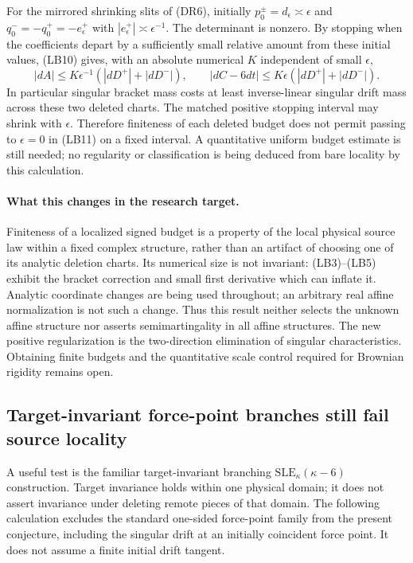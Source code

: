 \documentclass[11pt]{article}
\theoremstyle{definition}\newtheorem{definition}[theorem]{Definition}
\theoremstyle{remark}\newtheorem{remark}[theorem]{Remark}
\begin{document}
For the mirrored shrinking slits of (DR6), initially
$p_0^\pm=d_\epsilon\asymp\epsilon$ and
$q_0^-=-q_0^+=-e_\epsilon^+$ with
$|e_\epsilon^+|\asymp\epsilon^{-1}$. The determinant is nonzero.
By stopping when the coefficients depart by a sufficiently small
relative amount from these initial values, (LB10) gives, with an
absolute numerical $K$ independent of small $\epsilon$,
\[
 |dA|\le K\epsilon^{-1}(|dD^+|+|dD^-|),\qquad
 |dC-6dt|\le K\epsilon(|dD^+|+|dD^-|).
 \tag{LB11}
\]
In particular singular bracket mass costs at least inverse-linear
singular drift mass across these two deleted charts. The matched
positive stopping interval may shrink with $\epsilon$. Therefore
finiteness of each deleted budget does not permit passing to
$\epsilon=0$ in (LB11) on a fixed interval. A quantitative uniform
budget estimate is still needed; no regularity or classification is
being deduced from bare locality by this calculation.

\paragraph{What this changes in the research target.}
Finiteness of a localized signed budget is a property of the local
physical source law within a fixed complex structure, rather than an
artifact of choosing one of its analytic deletion charts. Its numerical
size is not invariant: (LB3)--(LB5) exhibit the bracket correction and
small first derivative which can inflate it. Analytic coordinate changes
are being used throughout; an arbitrary real affine normalization is
not such a change. Thus this result neither selects the unknown affine
structure nor asserts semimartingality in all affine structures. The new
positive regularization is the two-direction elimination of singular
characteristics. Obtaining finite budgets and the quantitative scale
control required for Brownian rigidity remains open.

\subsection{Target-invariant force-point branches still fail source locality}
\label{sec:forcepoint-locality-audit}

A useful test is the familiar target-invariant branching
$\mathrm{SLE}_\kappa(\kappa-6)$ construction. Target invariance holds
within one physical domain; it does not assert invariance under deleting
remote pieces of that domain. The following calculation excludes the
standard one-sided force-point family from the present conjecture,
including the singular drift at an initially coincident force point.
It does not assume a finite initial drift tangent.
\end{document}
